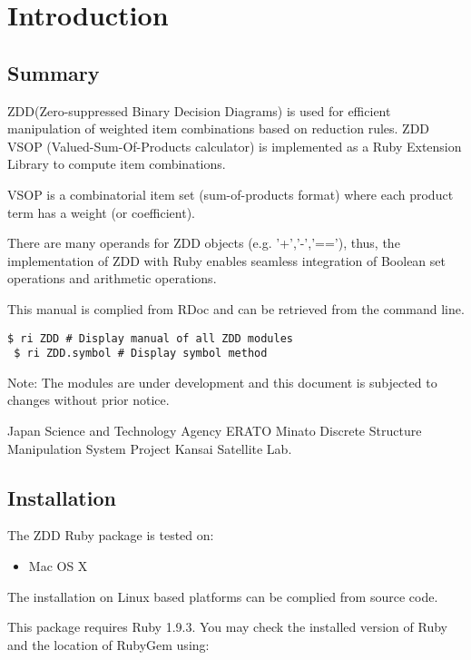 

\chapter[Getting Started]{Introduction}

\section{Summary}

 ZDD(Zero-suppressed Binary Decision Diagrams) is used for efficient manipulation of weighted item combinations based on reduction rules. ZDD VSOP (Valued-Sum-Of-Products calculator) is implemented as a Ruby Extension Library to compute item combinations.  
 
 VSOP is a combinatorial item set (sum-of-products format) where each product term has a weight (or coefficient). 
  
 There are many operands for ZDD objects (e.g. '+','-','=='), thus, the implementation of ZDD with Ruby enables seamless integration of Boolean set operations and arithmetic operations.  
 
 This manual is complied from RDoc and can be retrieved from the command line. 
 
\begin{Verbatim}[frame=single]
 $ ri ZDD # Display manual of all ZDD modules
 $ ri ZDD.symbol # Display symbol method 
\end{Verbatim}

 Note: The modules are under development and this document is subjected to changes without prior notice. 

Japan Science and Technology Agency  ERATO Minato Discrete Structure Manipulation System Project  Kansai Satellite Lab.


\section[Installation]{Installation}

The ZDD Ruby package is tested on: 
\begin{itemize}
	\item Mac OS X 
\end{itemize}

The installation on Linux based platforms can be complied from source code. 

 This package requires Ruby 1.9.3. You may check the installed version of Ruby and the location of RubyGem using:
 
